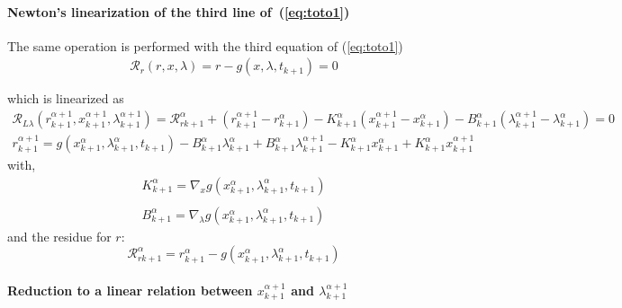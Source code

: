  \paragraph{Newton's linearization of the third  line of~(\ref{eq:toto1})}
The same operation is performed with the third equation of (\ref{eq:toto1})
\begin{equation}
  \begin{array}{l}
    \mathcal R_r(r,x,\lambda)=r-g(x,\lambda,t_{k+1}) =0\\ \\  \end{array}
\end{equation}
which is linearized as
\begin{equation}
  \label{eq:NL9}
  \begin{array}{l}
      \mathcal R_{L\lambda}(r^{\alpha+1}_{k+1},x^{\alpha+1}_{k+1},\lambda^{\alpha+1}_{k+1}) = \mathcal
      R_{rk+1}^{\alpha} + (r^{\alpha+1}_{k+1} - r^{\alpha}_{k+1}) -
      K^{\alpha}_{k+1}(x^{\alpha+1}_{k+1} - x^{\alpha}_{k+1})- B^{\alpha}_{k+1}(\lambda^{\alpha+1}_{k+1} -
      \lambda^{\alpha}_{k+1})=0
    \end{array}
  \end{equation}
\begin{equation}
  \label{eq:rrL}
  \begin{array}{l}
    \boxed{r^{\alpha+1}_{k+1} = g(x ^{\alpha}_{k+1},\lambda ^{\alpha}_{k+1},t_{k+1}) -B^{\alpha}_{k+1}
      \lambda^{\alpha}_{k+1} + B^{\alpha}_{k+1} \lambda^{\alpha+1}_{k+1}-K^{\alpha}_{k+1}
      x^{\alpha}_{k+1} + K^{\alpha}_{k+1} x^{\alpha+1}_{k+1}}       
  \end{array}
\end{equation}
with,
\begin{equation}
     \begin{array}{l}
  K^{\alpha}_{k+1} = \nabla_xg(x^{\alpha}_{k+1},\lambda ^{\alpha}_{k+1},t_{k+1})  \\ \\
  B^{\alpha}_{k+1} = \nabla_{\lambda}g(x^{\alpha}_{k+1},\lambda ^{\alpha}_{k+1},t_{k+1})
 \end{array}
\end{equation}
and the  residue for $r$:
\begin{equation}
\boxed{\mathcal
      R_{rk+1}^{\alpha} = r^{\alpha}_{k+1} - g(x^{\alpha}_{k+1},\lambda ^{\alpha}_{k+1},t_{k+1})}
  \end{equation}


\paragraph{Reduction to a linear relation between  $x^{\alpha+1}_{k+1}$ and
$\lambda^{\alpha+1}_{k+1}$}

